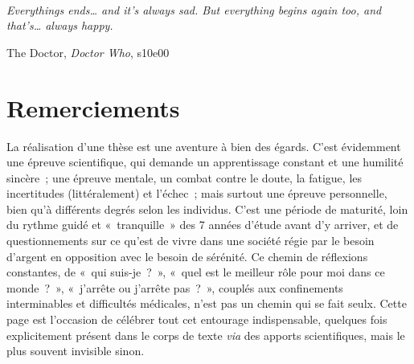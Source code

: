 \documentclass[../main/main.tex]{subfiles}
\begin{document}
\thispagestyle{empty}
~
\clearpage
\thispagestyle{empty}
\vspace*{\fill}
\epigraph{\openquote\textit{Everythings ends… and it's always sad. But
        everything begins again too, and that's… always happy.
\closequote}}{The Doctor, \textit{Doctor Who}, s10e00}
\vspace*{\fill}

\chapter*{Remerciements}
\setcounter{page}{1}

La réalisation d'une thèse est une aventure à bien des égards. C'est évidemment
une épreuve scientifique, qui demande un apprentissage constant et une humilité
sincère~; une épreuve mentale, un combat contre le doute, la fatigue, les
incertitudes (littéralement) et l'échec~; mais surtout une épreuve personnelle,
bien qu'à différents degrés selon les individus. C'est une période de maturité,
loin du rythme guidé et «~tranquille~» des 7 années d'étude avant d'y arriver,
et de questionnements sur ce qu'est de vivre dans une société régie par le
besoin d'argent en opposition avec le besoin de sérénité. Ce chemin de
réflexions constantes, de «~qui suis-je~?~», «~quel est le meilleur rôle pour
moi dans ce monde~?~», «~j'arrête ou j'arrête pas~?~», couplés aux confinements
interminables et difficultés médicales, n'est pas un chemin qui se fait seulx.
Cette page est l'occasion de célébrer tout cet entourage indispensable, quelques
fois explicitement présent dans le corps de texte \textit{via} des apports
scientifiques, mais le plus souvent invisible sinon.
\end{document}
